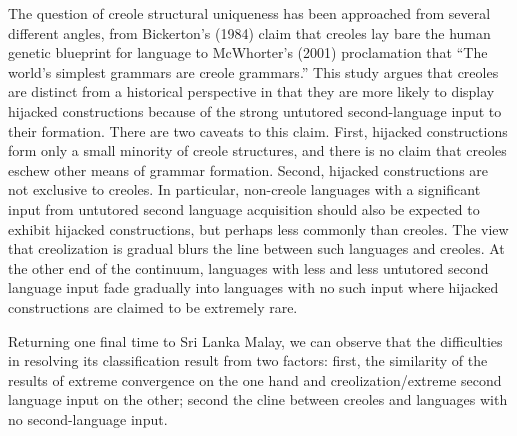 The question of creole structural uniqueness has been approached from several different angles, from Bickerton's (1984) \nocite{Bickerton1984} claim that creoles lay bare the human genetic blueprint for language to McWhorter's (2001) \nocite{McWhorter2001} proclamation that ``The world's simplest grammars are creole grammars.'' This study argues that creoles are distinct from a historical perspective in that they are more likely to display hijacked constructions because of the strong untutored second-language input to their formation. There are two caveats to this claim. First, hijacked constructions form only a small minority of creole structures, and there is no claim that creoles eschew other means of grammar formation. Second, hijacked constructions are not exclusive to creoles. In particular, non-creole languages with a significant input from untutored second language acquisition should also be expected to exhibit hijacked constructions, but perhaps less commonly than creoles. The view that creolization is gradual \citep{Arends1993} blurs the line between such languages and creoles. At the other end of the continuum, languages with less and less untutored second language input fade gradually into languages with no such input where hijacked constructions are claimed to be extremely rare.

Returning one final time to Sri Lanka Malay, we can observe that the difficulties in resolving its classification result from two factors: first, the similarity of the results of extreme convergence on the one hand and creolization/extreme second language input on the other; second the cline between creoles and languages with no second-language input.
 

% 
% 
% 
% 
% 
% 
% 
% 

